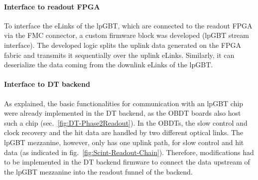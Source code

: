 \paragraph{Interface to readout FPGA}
To interface the eLinks of the \ac{lpGBT}, which are connected to the readout \ac{FPGA} via the \ac{FMC} connector, a custom firmware block was developed (lpGBT stream interface). The developed logic splits the uplink data generated on the \ac{FPGA} fabric and transmits it sequentially over the uplink eLinks. Similarly, it can deserialize the data coming from the downlink eLinks of the \ac{lpGBT}.
\paragraph{Interface to DT backend}
As explained, the basic functionalities for communication with an \ac{lpGBT} chip were already implemented in the \ac{DT} backend, as the \ac{OBDT} boards also host such a chip (sec.\ \ref{fig:DT-Phase2Readout}). In the \acp{OBDT}, the slow control and clock recovery and the hit data are handled by two different optical links. The \ac{lpGBT} mezzanine, however, only has one uplink path, for slow control and hit data (as indicated in fig.\ \ref{fig:Scint-Readout-Chain}). Therefore, modifications had to be implemented in the \ac{DT} backend firmware to connect the data upstream of the \ac{lpGBT} mezzanine into the readout funnel of the backend.
